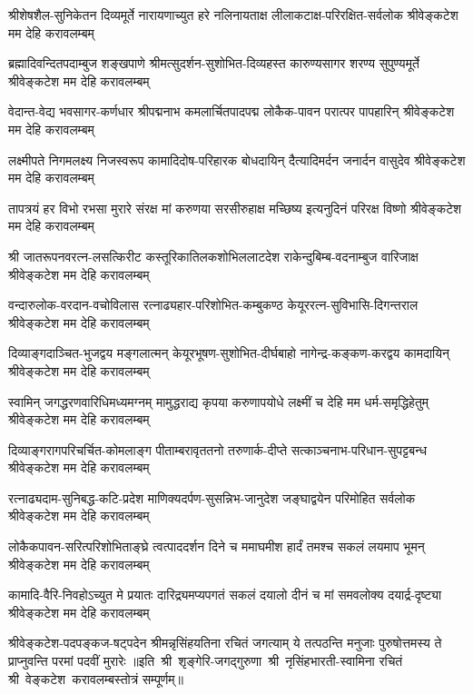 \fourlineindentedshloka
{श्रीशेषशैल-सुनिकेतन दिव्यमूर्ते}
{नारायणाच्युत हरे नलिनायताक्ष}
{लीलाकटाक्ष-परिरक्षित-सर्वलोक}
{श्रीवेङ्कटेश मम देहि करावलम्बम्}

\fourlineindentedshloka
{ब्रह्मादिवन्दितपदाम्बुज शङ्खपाणे}
{श्रीमत्सुदर्शन-सुशोभित-दिव्यहस्त}
{कारुण्यसागर शरण्य सुपुण्यमूर्ते}
{श्रीवेङ्कटेश मम देहि करावलम्बम्}

\fourlineindentedshloka
{वेदान्त-वेद्य भवसागर-कर्णधार}
{श्रीपद्मनाभ कमलार्चितपादपद्म}
{लोकैक-पावन परात्पर पापहारिन्}
{श्रीवेङ्कटेश मम देहि करावलम्बम्}

\fourlineindentedshloka
{लक्ष्मीपते निगमलक्ष्य निजस्वरूप}
{कामादिदोष-परिहारक बोधदायिन्}
{दैत्यादिमर्दन जनार्दन वासुदेव}
{श्रीवेङ्कटेश मम देहि करावलम्बम्}

\fourlineindentedshloka
{तापत्रयं हर विभो रभसा मुरारे}
{संरक्ष मां करुणया सरसीरुहाक्ष}
{मच्छिष्य इत्यनुदिनं परिरक्ष विष्णो}
{श्रीवेङ्कटेश मम देहि करावलम्बम्}

\fourlineindentedshloka
{श्री जातरूपनवरत्न-लसत्किरीट}
{कस्तूरिकातिलकशोभिललाटदेश}
{राकेन्दुबिम्ब-वदनाम्बुज वारिजाक्ष}
{श्रीवेङ्कटेश मम देहि करावलम्बम्}

\fourlineindentedshloka
{वन्दारुलोक-वरदान-वचोविलास}
{रत्नाढ्यहार-परिशोभित-कम्बुकण्ठ}
{केयूररत्न-सुविभासि-दिगन्तराल}
{श्रीवेङ्कटेश मम देहि करावलम्बम्}

\fourlineindentedshloka
{दिव्याङ्गदाञ्चित-भुजद्वय मङ्गलात्मन्}
{केयूरभूषण-सुशोभित-दीर्घबाहो}
{नागेन्द्र-कङ्कण-करद्वय कामदायिन्}
{श्रीवेङ्कटेश मम देहि करावलम्बम्}

\fourlineindentedshloka
{स्वामिन् जगद्धरणवारिधिमध्यमग्नम्}
{मामुद्धराद्य कृपया करुणापयोधे}
{लक्ष्मीं च देहि मम धर्म-समृद्धिहेतुम्}
{श्रीवेङ्कटेश मम देहि करावलम्बम्}

\fourlineindentedshloka
{दिव्याङ्गरागपरिचर्चित-कोमलाङ्ग}
{पीताम्बरावृततनो तरुणार्क-दीप्ते}
{सत्काञ्चनाभ-परिधान-सुपट्टबन्ध}
{श्रीवेङ्कटेश मम देहि करावलम्बम्}

\fourlineindentedshloka
{रत्नाढ्यदाम-सुनिबद्ध-कटि-प्रदेश}
{माणिक्यदर्पण-सुसन्निभ-जानुदेश}
{जङ्घाद्वयेन परिमोहित सर्वलोक}
{श्रीवेङ्कटेश मम देहि करावलम्बम्}

\fourlineindentedshloka
{लोकैकपावन-सरित्परिशोभिताङ्घ्रे}
{त्वत्पाददर्शन दिने च ममाघमीश}
{हार्दं तमश्च सकलं लयमाप भूमन्}
{श्रीवेङ्कटेश मम देहि करावलम्बम्}

\fourlineindentedshloka
{कामादि-वैरि-निवहोऽच्युत मे प्रयातः}
{दारिद्र्यमप्यपगतं सकलं दयालो}
{दीनं च मां समवलोक्य दयार्द्र-दृष्ट्या}
{श्रीवेङ्कटेश मम देहि करावलम्बम्}

\fourlineindentedshloka
{श्रीवेङ्कटेश-पदपङ्कज-षट्पदेन}
{श्रीमन्नृसिंहयतिना रचितं जगत्याम्}
{ये तत्पठन्ति मनुजाः पुरुषोत्तमस्य}
{ते प्राप्नुवन्ति परमां पदवीं मुरारेः}
॥इति~श्री~शृङ्गेरि-जगद्गुरुणा~श्री~नृसिंहभारती-स्वामिना रचितं श्री~वेङ्कटेश~करावलम्बस्तोत्रं सम्पूर्णम्॥